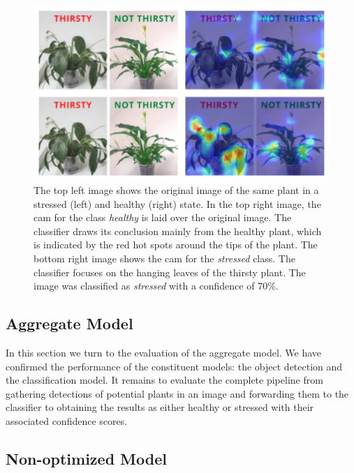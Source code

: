 \documentclass[final]{vutinfth} %
\begin{document}
\begin{figure}
  \centering
  \includegraphics{graphics/classifier-cam.pdf}
  \caption[Classifier \glspl{cam}.]{The top left image shows the
    original image of the same plant in a stressed (left) and healthy
    (right) state. In the top right image, the \gls{cam} for the class
    \emph{healthy} is laid over the original image. The classifier
    draws its conclusion mainly from the healthy plant, which is
    indicated by the red hot spots around the tips of the plant. The
    bottom right image shows the \gls{cam} for the \emph{stressed}
    class. The classifier focuses on the hanging leaves of the thirsty
    plant. The image was classified as \emph{stressed} with a
    confidence of 70\%.}
  \label{fig:classifier-cam}
\end{figure}

\subsection{Aggregate Model}
\label{ssec:aggregate-model}

In this section we turn to the evaluation of the aggregate model. We
have confirmed the performance of the constituent models: the object
detection and the classification model. It remains to evaluate the
complete pipeline from gathering detections of potential plants in an
image and forwarding them to the classifier to obtaining the results
as either healthy or stressed with their associated confidence scores.

\subsection{Non-optimized Model}
\label{ssec:model-non-optimized}
\end{document}
